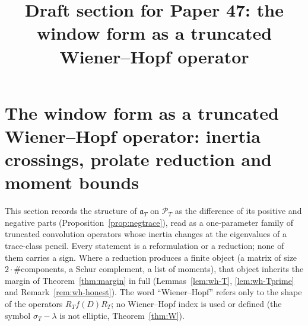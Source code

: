 \documentclass[11pt]{amsart}
\theoremstyle{definition}
\theoremstyle{remark}
\newcommand{\PT}{\mathcal P_T}
\newcommand{\sT}{\sigma_T}
\begin{document}
\title{Draft section for Paper 47: the window form as a truncated Wiener--Hopf operator}
\maketitle
\fi

\newcommand{\Pos}{\mathrm{Pos}_T}
\newcommand{\Neg}{\mathrm{Neg}_T}
\newcommand{\fp}{\mathfrak p}
\newcommand{\fn}{\mathfrak n}
\newcommand{\fa}{\mathfrak a_T}
\newcommand{\DT}{\mathcal D_T}
\newcommand{\tr}{\operatorname{tr}}

\section{The window form as a truncated Wiener--Hopf operator: inertia crossings, prolate reduction and moment bounds}\label{sec:wh}

This section records the structure of $\fa$ on $\PT$ as the difference of its positive and
negative parts (Proposition~\ref{prop:negtrace}), read as a one-parameter family of truncated
convolution operators whose inertia changes at the eigenvalues of a trace-class pencil. Every
statement is a reformulation or a reduction; none of them carries a sign. Where a reduction
produces a finite object (a matrix of size $2\cdot\#$components, a Schur complement, a list of
moments), that object inherits the margin of Theorem~\ref{thm:margin} in full
(Lemmas~\ref{lem:wh-T}, \ref{lem:wh-Tprime} and Remark~\ref{rem:wh-honest}). The word
``Wiener--Hopf'' refers only to the shape of the operators $R_Tf(D)R_T$; no Wiener--Hopf
index is used or defined (the symbol $\sT-\lambda$ is not elliptic, Theorem~\ref{thm:W}).
\end{document}
